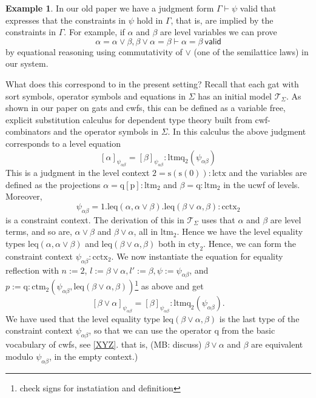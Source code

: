 \documentclass[11pt,a4paper]{article}
\theoremstyle{definition}
\newtheorem{example}{Example}
\newcommand{\valid}{\mathsf{valid}}
\def\psiab{\psi_{\alpha\beta}}
\newcommand{\T}{\mathsf{T}}
\def\lctx{\mathrm{lctx}}
\def\ltm{\mathrm{ltm}}
\def\ltmq{\mathrm{ltmq}}
\def\leq{\mathrm{leq}}
\def\s{\mathrm{s}}
\def\cctx{\mathrm{cctx}}
\def\cty{\mathrm{cty}}
\def\ctm{\mathrm{ctm}}
\def\p{\mathrm{p}}
\def\q{\mathrm{q}}
\def\T{\mathcal{T}}
\begin{document}
\begin{example}\label{exa:cctx-entails-lattice-eqs}
In our old paper we have a judgment form $\Gamma \vdash \psi$ valid that expresses that the constraints in $\psi$
hold in $\Gamma$, that is, are implied by the constraints in $\Gamma$.
For example, if $\alpha$ and $\beta$ are level variables we can prove
$$
\alpha = \alpha\vee\beta, \beta\vee\alpha = \beta \vdash \alpha = \beta\ \valid
$$
by equational reasoning using commutativity of $\vee$ (one of the semilattice laws) in our system.

What does this correspond to in the present setting? Recall that each gat with sort symbols, operator symbols and equations in $\Sigma$ has an initial model $\T_\Sigma$. As shown in our paper on gats and cwfs, this can be defined as a variable free, explicit substitution calculus for dependent type theory built from cwf-combinators and the operator symbols in $\Sigma$\cite{bezem:hofmann}. In this calculus the above judgment corresponds to a level equation
$$
[\alpha]_{\psiab} = [\beta]_{\psiab} : \ltmq_2(\psiab)
$$
This is a judgment in the level context $2 = \s(\s(0)) : \lctx$ and the variables are defined as the projections $\alpha = \q[\p] : \ltm_2$ and $\beta = \q  : \ltm_2$ in the ucwf of levels. Moreover, 
$$
\psiab = 1.\leq(\alpha,\alpha\vee\beta).\leq(\beta\vee\alpha,\beta) : \cctx_2
$$
is a constraint context. The derivation of this in $\T_\Sigma$ uses that 
$\alpha$ and $\beta$ are level terms, and so are, 
$\alpha\vee\beta$ and $\beta\vee\alpha$, all in $\ltm_2$.
Hence we have the level equality types
$\leq(\alpha,\alpha\vee\beta)$ and $\leq(\beta\vee\alpha,\beta)$ both in $\cty_2$. Hence, we can form the constraint context $\psiab : \cctx_2$.
We now instantiate the equation for equality reflection
with $n := 2$, $l :=  \beta\vee\alpha, l':= \beta, \psi:= \psiab$, and $p := \q: \ctm_2(\psiab,\leq(\beta\vee\alpha,\beta))$\footnote{check signs for instatiation and definition}
as above and get 
\[
[\beta\vee\alpha]_{\psiab} = [\beta]_{\psiab} : \ltmq_2(\psiab).
\]
We have used that the
level equality type $\leq(\beta\vee\alpha,\beta)$ is the last type
of the constraint context $\psiab$, so that we can use the operator $\q$ 
from the basic vocabulary of cwfs, see \ref{XYZ}.
that is, (MB: discuss) $\beta\vee\alpha$ and $\beta$ are equivalent
modulo $\psiab$, in the empty context.)


\end{example}
\end{document}
